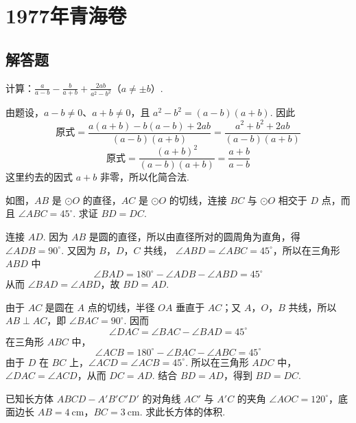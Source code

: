 \chapter{1977年青海卷}

\section{解答题}

\begin{problem}
计算：\( \frac{a}{a-b}-\frac{b}{a+b}+\frac{2ab}{a^2-b^2} \)（\(a\neq\pm b\)）.
\end{problem}

\begin{solution}
由题设，\(a-b\neq0\)、\(a+b\neq0\)，且
\(a^2-b^2=(a-b)(a+b)\). 因此
\[
\text{原式}=\frac{a(a+b)-b(a-b)+2ab}{(a-b)(a+b)}
 =\frac{a^2+b^2+2ab}{(a-b)(a+b)}
\]
\[
\text{原式}=\frac{(a+b)^2}{(a-b)(a+b)}=\frac{a+b}{a-b}
\]
这里约去的因式 \(a+b\) 非零，所以化简合法.
\end{solution}

\begin{problem}
如图，\(AB\) 是 \(\odot O\) 的直径，\(AC\) 是 \(\odot O\) 的切线，连接 \(BC\) 与 \(\odot O\) 相交于 \(D\) 点，而且 \(\angle ABC=45^\circ\). 求证 \(BD=DC\).

\end{problem}

\begin{solution}
连接 \(AD\). 因为 \(AB\) 是圆的直径，所以由直径所对的圆周角为直角，得
\(\angle ADB=90^\circ\). 又因为 \(B\)，\(D\)，\(C\) 共线，
\(\angle ABD=\angle ABC=45^\circ\)，所以在三角形 \(ABD\) 中
\[
\angle BAD=180^\circ-\angle ADB-\angle ABD=45^\circ
\]
从而 \(\angle BAD=\angle ABD\)，故 \(BD=AD\).

由于 \(AC\) 是圆在 \(A\) 点的切线，半径 \(OA\) 垂直于 \(AC\)；又 \(A\)，\(O\)，\(B\) 共线，所以 \(AB\perp AC\)，即 \(\angle BAC=90^\circ\). 因而
\[
\angle DAC=\angle BAC-\angle BAD=45^\circ
\]
在三角形 \(ABC\) 中，
\[
\angle ACB=180^\circ-\angle BAC-\angle ABC=45^\circ
\]
由于 \(D\) 在 \(BC\) 上，\(\angle ACD=\angle ACB=45^\circ\). 所以在三角形 \(ADC\) 中，\(\angle DAC=\angle ACD\)，从而 \(DC=AD\). 结合 \(BD=AD\)，得到 \(BD=DC\).
\end{solution}

\begin{problem}
已知长方体 \(ABCD-A'B'C'D'\) 的对角线 \(AC'\) 与 \(A'C\) 的夹角 \(\angle AOC=120^\circ\)，底面边长 \(AB=4\mathrm{~cm}\)，\(BC=3\mathrm{~cm}\). 求此长方体的体积.

\end{problem}

